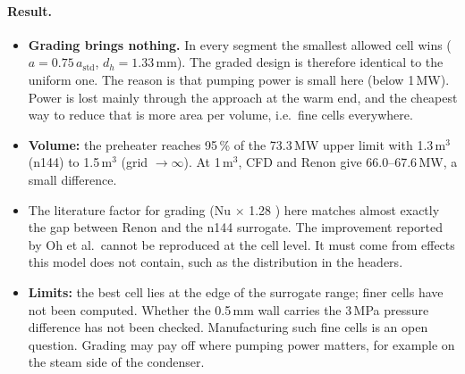

\paragraph{Result.}
\begin{itemize}
\item \textbf{Grading brings nothing.} In every segment the smallest allowed cell wins ($a = 0.75\,a_\mathrm{std}$,
  $d_h = 1.33$\,mm). The graded design is therefore identical to the uniform one. The reason is that pumping power is
  small here (below 1\,MW). Power is lost mainly through the approach at the warm end, and the cheapest way to reduce
  that is more area per volume, i.e.\ fine cells everywhere.
\item \textbf{Volume:} the preheater reaches 95\,\% of the 73.3\,MW upper limit with 1.3\,m$^3$ (n144) to 1.5\,m$^3$
  (grid $\to\infty$). At 1\,m$^3$, CFD and Renon give 66.0--67.6\,MW, a small difference.
\item The literature factor for grading (Nu $\times$ 1.28 \cite{oh2025}) here matches almost exactly the gap between
  Renon and the n144 surrogate. The improvement reported by Oh et al.\ cannot be reproduced at the cell level. It must
  come from effects this model does not contain, such as the distribution in the headers.
\item \textbf{Limits:} the best cell lies at the edge of the surrogate range; finer cells have not been computed. Whether
  the 0.5\,mm wall carries the 3\,MPa pressure difference has not been checked. Manufacturing such fine cells is an open
  question. Grading may pay off where pumping power matters, for example on the steam side of the condenser.
\end{itemize}
